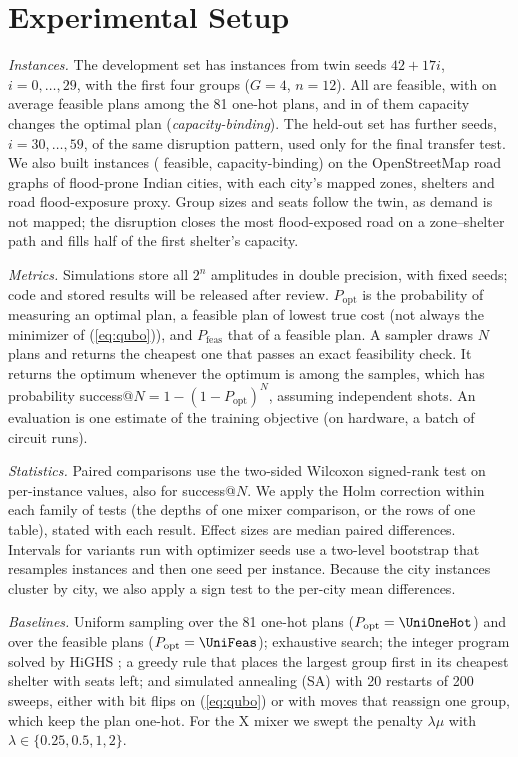 \documentclass[conference]{IEEEtran}
\begin{document}
\section{Experimental Setup}\label{sec:setup}
\textit{Instances.} The development set has \NInst{} instances from twin seeds $42+17i$, $i=0,\dots,29$, with the first four groups ($G=4$, $n=12$). All are feasible, with on average \MeanFeasAssign{} feasible plans among the 81 one-hot plans, and in \NBinding{} of them capacity changes the optimal plan (\emph{capacity-binding}). The held-out set has \HoN{} further seeds, $i=30,\dots,59$, of the same disruption pattern, used only for the final transfer test. We also built \CityAll{} instances (\CityN{} feasible, \CityBinding{} capacity-binding) on the OpenStreetMap road graphs of \CityNCities{} flood-prone Indian cities, with each city's mapped zones, shelters and road flood-exposure proxy. Group sizes and seats follow the twin, as demand is not mapped; the disruption closes the most flood-exposed road on a zone--shelter path and fills half of the first shelter's capacity.

\textit{Metrics.} Simulations store all $2^n$ amplitudes in double precision, with fixed seeds; code and stored results will be released after review. $P_{\mathrm{opt}}$ is the probability of measuring an optimal plan, a feasible plan of lowest true cost (not always the minimizer of (\ref{eq:qubo})), and $P_{\mathrm{feas}}$ that of a feasible plan. A sampler draws $N$ plans and returns the cheapest one that passes an exact feasibility check. It returns the optimum whenever the optimum is among the samples, which has probability success@$N=1-(1-P_{\mathrm{opt}})^N$, assuming independent shots. An evaluation is one estimate of the training objective (on hardware, a batch of circuit runs).

\textit{Statistics.} Paired comparisons use the two-sided Wilcoxon signed-rank test on per-instance values, also for success@$N$. We apply the Holm correction within each family of tests (the depths of one mixer comparison, or the rows of one table), stated with each result. Effect sizes are median paired differences. Intervals for variants run with \NSeeds{} optimizer seeds use a two-level bootstrap that resamples instances and then one seed per instance. Because the city instances cluster by city, we also apply a sign test to the per-city mean differences.

\textit{Baselines.} Uniform sampling over the 81 one-hot plans ($P_{\mathrm{opt}}=\UniOneHot$) and over the feasible plans ($P_{\mathrm{opt}}=\UniFeas$); exhaustive search; the integer program solved by HiGHS \cite{Huangfu2018}; a greedy rule that places the largest group first in its cheapest shelter with seats left; and simulated annealing (SA) \cite{Kirkpatrick1983} with 20 restarts of 200 sweeps, either with bit flips on (\ref{eq:qubo}) or with moves that reassign one group, which keep the plan one-hot. For the X mixer we swept the penalty $\lambda\mu$ with $\lambda\in\{0.25,0.5,1,2\}$.
\end{document}
